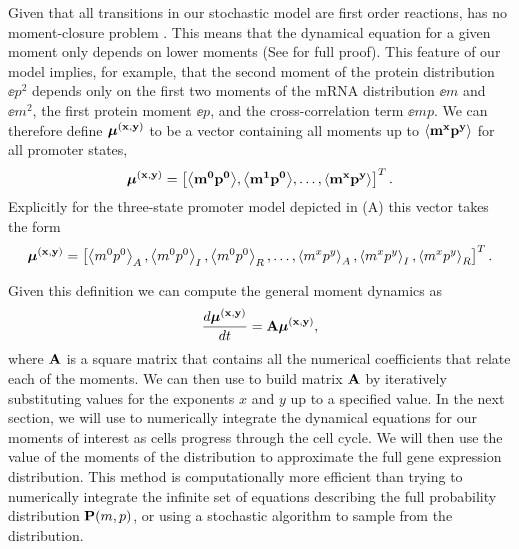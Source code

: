 Given that all transitions in our stochastic model are first order reactions,
 has no moment-closure problem \cite{Voliotis2014a}. This
means that the dynamical equation for a given moment only depends on lower
moments (See  for full proof). This feature of our model
implies, for example, that the second moment of the protein distribution
$\ee{p^2}$ depends only on the first two moments of the mRNA distribution
$\ee{m}$ and $\ee{m^2}$, the first protein moment $\ee{p}$, and the
cross-correlation term $\ee{mp}$. We can therefore define $\boldsymbol{\mu}^{\mathbf{(x, y)}}$ to be a vector
containing all moments up to $\mathbf{\left\langle m^x p^y \right\rangle}$ for all promoter states,
\begin{equation}
\boldsymbol{\mu}^{\mathbf{(x, y)}} = \left[ \mathbf{\left\langle m^0 p^0 \right\rangle},
							\mathbf{\left\langle m^1 p^0 \right\rangle},
							\ldots, \mathbf{\left\langle m^x p^y \right\rangle} \right]^T.
\end{equation}
Explicitly for the three-state promoter model depicted in
(A) this vector takes the form
\begin{equation}
	\boldsymbol{\mu}^{\mathbf{(x, y)}} = \left[ \left\langle m^0 p^0 \right\rangle_A, \left\langle m^0 p^0 \right\rangle_I, \left\langle m^0 p^0 \right\rangle_R,
	\ldots, \left\langle m^x p^y \right\rangle_A, \left\langle m^x p^y \right\rangle_I, \left\langle m^x p^y \right\rangle_R \right]^T.
\end{equation}

Given this definition we can compute the general moment dynamics as
\begin{equation}
{d{\boldsymbol{\mu}^{\mathbf{(x, y)}}} \over dt} = \mathbf{A} \boldsymbol{\mu}^{\mathbf{(x, y)}},
\label{eq_mom_dynamics}
\end{equation}
where $\mathbf{A}$ is a square matrix that contains all the numerical coefficients
that relate each of the moments. We can then use  to build
matrix $\mathbf{A}$ by iteratively substituting values for the exponents $x$ and
$y$ up to a specified value. In the next section, we will use
 to numerically integrate the dynamical equations for our
moments of interest as cells progress through the cell cycle. We will then use
the value of the moments of the distribution to approximate the full gene
expression distribution. This method is computationally more efficient than
trying to numerically integrate the infinite set of equations describing the
full probability distribution $\mathbf{P}(m, p)$, or using a stochastic algorithm 
to sample from the distribution.
